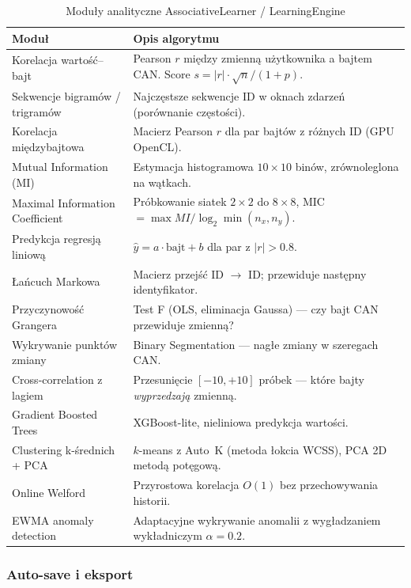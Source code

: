 \documentclass[12pt, a4paper]{article}
\begin{document}
\begin{table}[H]
\caption{Moduły analityczne AssociativeLearner / LearningEngine}
\label{tab:ml}
\centering
\small
\begin{tabular}{p{4.8cm}p{10.0cm}}
\toprule
\textbf{Moduł} & \textbf{Opis algorytmu} \\
\midrule
Korelacja wartość--bajt &
  Pearson $r$ między zmienną użytkownika a bajtem CAN. Score $s=|r|\cdot\sqrt{n}/(1+p)$. \\
Sekwencje bigramów / trigramów &
  Najczęstsze sekwencje ID w oknach zdarzeń (porównanie częstości). \\
Korelacja międzybajtowa &
  Macierz Pearson $r$ dla par bajtów z różnych ID (GPU OpenCL). \\
Mutual Information (MI) &
  Estymacja histogramowa $10\times10$ binów, zrównoleglona na wątkach. \\
Maximal Information Coefficient &
  Próbkowanie siatek $2\times 2$ do $8\times 8$, MIC $= \max MI / \log_2\min(n_x,n_y)$. \\
Predykcja regresją liniową &
  $\hat{y}=a\cdot\text{bajt}+b$ dla par z $|r|>0.8$. \\
Łańcuch Markowa &
  Macierz przejść ID $\to$ ID; przewiduje następny identyfikator. \\
Przyczynowość Grangera &
  Test F (OLS, eliminacja Gaussa) --- czy bajt CAN przewiduje zmienną? \\
Wykrywanie punktów zmiany &
  Binary Segmentation --- nagłe zmiany w szeregach CAN. \\
Cross-correlation z lagiem &
  Przesunięcie $[-10,+10]$ próbek --- które bajty \emph{wyprzedzają} zmienną. \\
Gradient Boosted Trees &
  XGBoost-lite, nieliniowa predykcja wartości. \\
Clustering k-średnich + PCA &
  $k$-means z Auto~K (metoda łokcia WCSS), PCA 2D metodą potęgową. \\
Online Welford &
  Przyrostowa korelacja $O(1)$ bez przechowywania historii. \\
EWMA anomaly detection &
  Adaptacyjne wykrywanie anomalii z wygładzaniem wykładniczym $\alpha=0.2$. \\
\bottomrule
\end{tabular}
\end{table}

\subsubsection*{Auto-save i eksport}
\end{document}
